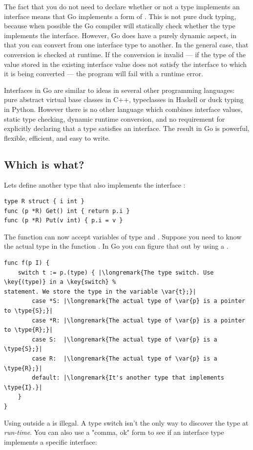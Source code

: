 The fact that you do not need to declare whether or not a type implements an
interface means that Go implements a form of 
\cite{duck_typing}. 
This is not
pure duck typing, because when possible the Go compiler will statically
check whether the type implements the interface. However, Go does have a
purely dynamic aspect, in that you can convert from one interface type
to another. In the general case, that conversion is checked at runtime.
If the conversion is invalid --- if the type of the value stored in the
existing interface value does not satisfy the interface to which it is
being converted --- the program will fail with a runtime error.

Interfaces in Go are similar to ideas in several other programming languages:
pure abstract virtual base classes in C++, typeclasses in Haskell or duck typing
in Python. However there is no other language which combines
interface values, static type checking, dynamic runtime conversion, and no
requirement for explicitly declaring that a type satisfies an interface. The
result in Go is powerful, flexible, efficient, and easy to write.

\subsection{Which is what?}
Lets define another type that also implements the interface :
\begin{lstlisting}[caption=Another type that implements I]
type R struct { i int }
func (p *R) Get() int { return p.i }
func (p *R) Put(v int) { p.i = v }
\end{lstlisting}
The function  can now accept variables of type  and .
Suppose you need to know the actual type in the function . In Go you can 
figure that out by using a .

\begin{lstlisting}
func f(p I) {
    switch t := p.(type) { |\longremark{The type switch. Use \key{(type)} in a \key{switch} %
statement. We store the type in the variable \var{t};}|
        case *S: |\longremark{The actual type of \var{p} is a pointer to \type{S};}|
        case *R: |\longremark{The actual type of \var{p} is a pointer to \type{R};}|
        case S:  |\longremark{The actual type of \var{p} is a \type{S};}|
        case R:  |\longremark{The actual type of \var{p} is a \type{R};}|
        default: |\longremark{It's another type that implements \type{I}.}|
    }
}
\end{lstlisting}
\showremarks
Using  outside a  is illegal. A type switch isn't the only way
to discover the type at \emph{run-time}. 
You can also use a "comma, ok" form to see if an interface type implements
a specific interface:

